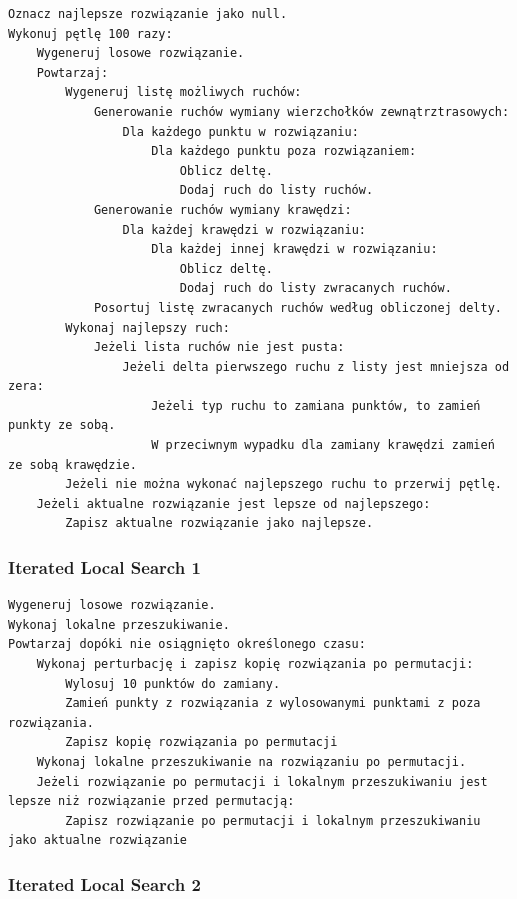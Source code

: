 \documentclass[a4paper]{article}
\begin{document}
\begin{lstlisting}
Oznacz najlepsze rozwiązanie jako null.
Wykonuj pętlę 100 razy:
    Wygeneruj losowe rozwiązanie.
    Powtarzaj:
        Wygeneruj listę możliwych ruchów:
            Generowanie ruchów wymiany wierzchołków zewnątrztrasowych:
                Dla każdego punktu w rozwiązaniu:
                    Dla każdego punktu poza rozwiązaniem:
                        Oblicz deltę.
                        Dodaj ruch do listy ruchów.
            Generowanie ruchów wymiany krawędzi:
                Dla każdej krawędzi w rozwiązaniu:
                    Dla każdej innej krawędzi w rozwiązaniu:
                        Oblicz deltę.
                        Dodaj ruch do listy zwracanych ruchów.
            Posortuj listę zwracanych ruchów według obliczonej delty.
        Wykonaj najlepszy ruch:
            Jeżeli lista ruchów nie jest pusta:
                Jeżeli delta pierwszego ruchu z listy jest mniejsza od zera:
                    Jeżeli typ ruchu to zamiana punktów, to zamień punkty ze sobą.
                    W przeciwnym wypadku dla zamiany krawędzi zamień ze sobą krawędzie.
        Jeżeli nie można wykonać najlepszego ruchu to przerwij pętlę.
    Jeżeli aktualne rozwiązanie jest lepsze od najlepszego:
    	Zapisz aktualne rozwiązanie jako najlepsze.
\end{lstlisting}

\subsubsection{Iterated Local Search 1}

\begin{lstlisting}
Wygeneruj losowe rozwiązanie.
Wykonaj lokalne przeszukiwanie.
Powtarzaj dopóki nie osiągnięto określonego czasu:
    Wykonaj perturbację i zapisz kopię rozwiązania po permutacji:
        Wylosuj 10 punktów do zamiany.
        Zamień punkty z rozwiązania z wylosowanymi punktami z poza rozwiązania.
        Zapisz kopię rozwiązania po permutacji
    Wykonaj lokalne przeszukiwanie na rozwiązaniu po permutacji.
    Jeżeli rozwiązanie po permutacji i lokalnym przeszukiwaniu jest lepsze niż rozwiązanie przed permutacją:
    	Zapisz rozwiązanie po permutacji i lokalnym przeszukiwaniu jako aktualne rozwiązanie
\end{lstlisting}

\subsubsection{Iterated Local Search 2}
\end{document}
